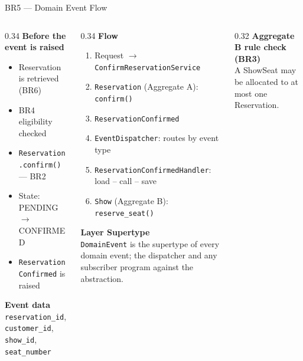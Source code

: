 \documentclass[aspectratio=169,11pt]{beamer}
\newcommand{\code}[1]{\texttt{#1}}
\begin{document}
\begin{frame}{BR5 --- Domain Event Flow}
  \begin{columns}[t]
    \begin{column}{0.34\textwidth}
      \scriptsize
      \textbf{Before the event is raised}
      \begin{itemize}
        \item Reservation is retrieved (BR6)
        \item BR4 eligibility checked
        \item \code{Reservation.confirm()} --- BR2
        \item State: PENDING $\rightarrow$ CONFIRMED
        \item \code{ReservationConfirmed} is raised
      \end{itemize}
      \vspace{0.15cm}
      \textbf{Event data}\\
      \code{reservation\_id}, \code{customer\_id}, \code{show\_id},
      \code{seat\_number}
    \end{column}
    \begin{column}{0.34\textwidth}
      \scriptsize
      \textbf{Flow}
      \begin{enumerate}
        \item Request $\rightarrow$ \code{ConfirmReservationService}
        \item \code{Reservation} (Aggregate A): \code{confirm()}
        \item \code{ReservationConfirmed}
        \item \code{EventDispatcher}: routes by event type
        \item \code{ReservationConfirmedHandler}: load -- call -- save
        \item \code{Show} (Aggregate B): \code{reserve\_seat()}
      \end{enumerate}
    \textbf{Layer Supertype}\\
      \code{DomainEvent} is the supertype of every domain event; the
      dispatcher and any subscriber program against the abstraction.
    \end{column}
    \begin{column}{0.32\textwidth}
      \scriptsize
      \textbf{Aggregate B rule check (BR3)}\\
      A ShowSeat may be allocated to at most one Reservation.

\end{column}
\end{columns}
\end{frame}
\end{document}
